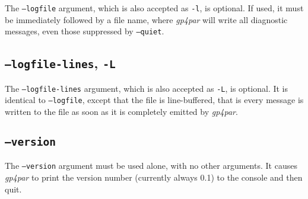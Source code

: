 \documentclass[11pt]{article}
\newcommand{\namestyle}[1]{\textit{#1}}
\begin{document}
The \texttt{--logfile} argument, which is also accepted as \texttt{-l}, is optional. If used, it must be immediately
followed by a file name, where \namestyle{gp4par} will write all diagnostic messages, even those suppressed by
\texttt{--quiet}.

\subsection{\texttt{--logfile-lines}, \texttt{-L}}

The \texttt{--logfile-lines} argument, which is also accepted as \texttt{-L}, is optional. It is identical to
\texttt{--logfile}, except that the file is line-buffered, that is every message is written to the file as soon
as it is completely emitted by \namestyle{gp4par}.

\subsection{\texttt{--version}}

The \texttt{--version} argument must be used alone, with no other arguments. It causes \namestyle{gp4par} to print the version number
(currently always 0.1) to the console and then quit.
\end{document}
